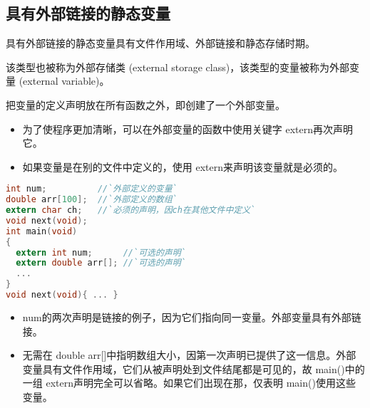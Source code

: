 \subsection{具有外部链接的静态变量}
\begin{frame}[fragile]\ft{\subsecname}
 具有外部链接的静态变量具有文件作用域、外部链接和静态存储时期。\vspace{0.1in}
 
 该类型也被称为外部存储类{ (external storage class)}，该类型的变量被称为外部变量{ (external variable)}。\vspace{0.1in}

 把变量的定义声明放在所有函数之外，即创建了一个外部变量。
\end{frame}

\begin{frame}[fragile]\ft{\subsecname}
  \begin{itemize}
  \item 
    为了使程序更加清晰，可以在外部变量的函数中使用关键字{ extern}再次声明它。\\[0.1in]
  \item
    如果变量是在别的文件中定义的，使用{ extern}来声明该变量就是必须的。
  \end{itemize}
\end{frame}

\begin{frame}[fragile]\ft{\subsecname}
\begin{lstlisting}[language=c,frame=single]
int num;          //`外部定义的变量`
double arr[100];  //`外部定义的数组`
extern char ch;   //`必须的声明，因ch在其他文件中定义`
void next(void);
int main(void)
{
  extern int num;      //`可选的声明`
  extern double arr[]; //`可选的声明`
  ...
}
void next(void){ ... }
\end{lstlisting}
\end{frame}

\begin{frame}[fragile]\ft{\subsecname}
\begin{itemize}
\item { num}的两次声明是链接的例子，因为它们指向同一变量。外部变量具有外部链接。
\item 无需在{ double arr[]}中指明数组大小，因第一次声明已提供了这一信息。外部变量具有文件作用域，它们从被声明处到文件结尾都是可见的，故{ main()}中的一组{ extern}声明完全可以省略。如果它们出现在那，仅表明{ main()}使用这些变量。
\end{itemize}
\end{frame}

